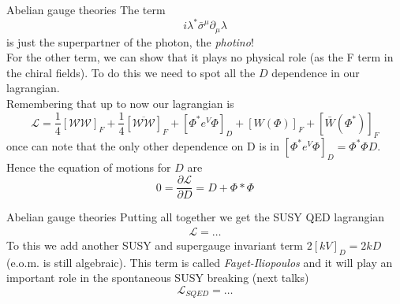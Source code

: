 \documentclass[10pt]{beamer}
\begin{document}
\begin{frame}{Abelian gauge theories}
The term 
\begin{equation*}
    i\lambda^* \bar\sigma^{\mu}\partial_{\mu} \lambda
\end{equation*}
is just the superpartner of the photon, the \emph{photino}! \\
For the other term, we can show that it plays no physical role (as the F term in the chiral fields). To do this we need to spot all the $D$ dependence in our lagrangian. \\
Remembering that up to now our lagrangian is 
\begin{equation*}
    \mathcal{L} = \frac{1}{4}\left[\mathcal{WW}\right]_F + \frac{1}{4} \left[\overline{\mathcal{WW}}\right]_F + \left[\Phi^* e^V \Phi\right]_D + [W(\Phi)]_F + [\bar W(\Phi^*)]_F
\end{equation*}
once can note that the only other dependence on D is in $\left[\Phi^* e^V \Phi \right]_D = \Phi^*\Phi D$.
Hence the equation of motions for $D$ are
\begin{equation*}
    0 = \frac{\partial \mathcal{L}}{\partial D} = D + \Phi* \Phi 
\end{equation*}
\end{frame}

\begin{frame}{Abelian gauge theories}
Putting all together we get the SUSY QED lagrangian 
\begin{gather*}
    \mathcal{L} = \dots
\end{gather*}
To this we add another SUSY and supergauge invariant term $2[kV]_D = 2kD$ (e.o.m. is still algebraic). 
This term is called \emph{Fayet-Iliopoulos} and it will play an important role in the spontaneous SUSY breaking (next talks)
\begin{equation*}
    \boxed{\mathcal{L}_{SQED} = \dots}
\end{equation*}
\end{frame}
\end{document}
